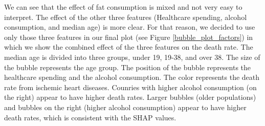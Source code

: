 We can see that the effect of fat consumption is mixed and not very easy to interpret. The effect of the other three features 
(Healthcare spending, alcohol consumption, and median age) is more clear. For that reason, we decided to use only those three features in our final plot 
(see Figure \ref{bubble_plot_factors}) in which we show the combined effect of the three features on the death rate. The median age is divided into three groups, under 19, 19-38, and over 38. The size of the bubble represents the age group. The position of the bubble represents the healthcare spending and the alcohol consumption. The color represents the death rate from ischemic heart diseases.
Counries with higher alcohol consumption (on the right) appear to have higher death rates.
Larger bubbles (older populations) and bubbles on the right (higher alcohol consumption) appear to have higher death rates, which is consistent with the SHAP values.

